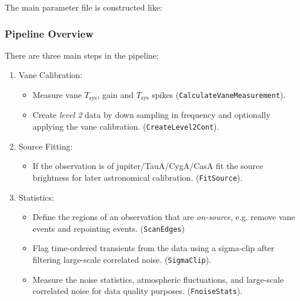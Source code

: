 \documentclass[11pt]{article}
\begin{document}
The main parameter file is constructed like:

{\center
\noindent{}
}



\subsubsection{Pipeline Overview}

There are three main steps in the pipeline:
\begin{enumerate}
  \item Vane Calibration: 
    \begin{itemize}
      \item Measure vane $T_\mathrm{sys}$, gain and $T_\mathrm{sys}$ spikes (\texttt{CalculateVaneMeasurement}).
      \item Create \textit{level 2} data by down sampling in frequency and optionally applying the vane calibration. (\texttt{CreateLevel2Cont}).
    \end{itemize}
   \item Source Fitting:
    \begin{itemize}
      \item If the observation is of jupiter/TauA/CygA/CasA fit the source brightness for later astronomical calibration. (\texttt{FitSource}).
    \end{itemize}
   \item Statistics:
     \begin{itemize}
       \item Define the regions of an observation that are \textit{on-source}, e.g. remove vane events and repointing events. (\texttt{ScanEdges})
         \item Flag time-ordered transients from the data using a sigma-clip after filtering large-scale correlated noise. (\texttt{SigmaClip}).
           \item Measure the noise statistics, atmospheric fluctuations, and large-scale correlated noise for data quality purposes. (\texttt{FnoiseStats}).
     \end{itemize}
\end{enumerate}
\end{document}
